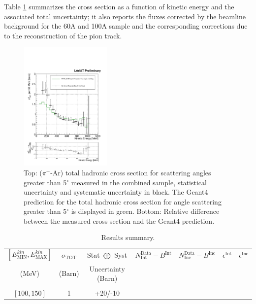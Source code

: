 \documentclass[aps,prl,twocolumn,showpacs,superscriptaddress,groupedaddress]{revtex4}  %
\begin{document}
Table \ref{tab:XSsummary} summarizes the cross section as a function of kinetic energy and  the associated total uncertainty; it also reports the fluxes corrected by the beamline background for the 60A and 100A sample and the corresponding corrections due to the reconstruction of the pion track.\\


\begin{figure}
\includegraphics[width =0.4\textwidth ]{TheRealMoneyPlot}
\caption{\label{fig:epsart} Top: ($\pi^-$-Ar) total hadronic cross section for  scattering angles greater than 5$^\circ$ measured in the combined sample, statistical uncertainty and systematic uncertainty in black. The Geant4 prediction for the total hadronic cross section for angle scattering greater than 5$^\circ$ is displayed in green. Bottom: Relative difference between the measured cross section and the Geant4 prediction. }
\end{figure}

\begin{table}
\caption{\label{tab:XSsummary} Results summary. }
\begin{ruledtabular}
\begin{tabular}{ccccccc}
$[E^{kin}_{\text{MIN}}, E^{kin}_{\text{MAX}}]$ & $\sigma_{\text{TOT}}$ & Stat $\bigoplus$ Syst  & $N^{ \text{Data}}_{ \text{Int}} - B^{ \text{Int}}$
& $N^{ \text{Data}}_{ \text{Inc}} - B^{ \text{Inc}}$ & $ \epsilon^{\text{Int}} $ & $\epsilon^{\text{Inc}}$ \\ 
(MeV)& (Barn)& Uncertainty (Barn) & & & \\\hline
& & & & & \\
 $[100,150]$ &1&+20/-10 & & & & \\
\end{tabular}
\end{ruledtabular}
\end{table}
\end{document}
